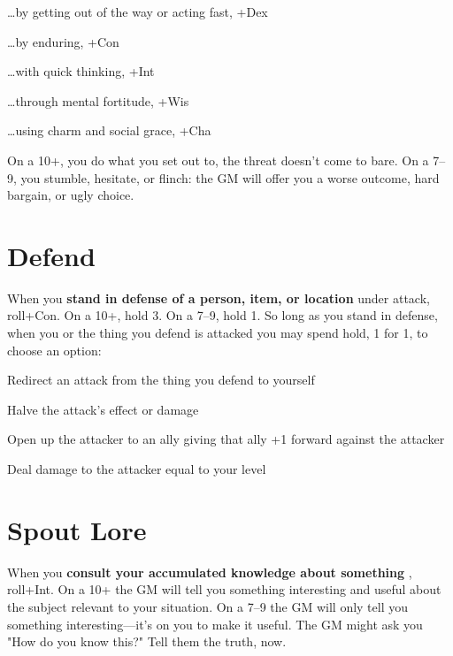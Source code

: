          
\item …by getting out of the way or acting fast, +Dex

         
\item …by enduring, +Con

         
\item …with quick thinking, +Int

         
\item …through mental fortitude, +Wis

         
\item …using charm and social grace, +Cha

       
\stopitemize
       

On a 10+, you do what you set out to, the threat doesn't come to bare. On a 7–9, you stumble, hesitate, or flinch: the GM will offer you a worse outcome, hard bargain, or ugly choice.

       
\section{Defend}   
       

When you {\bf stand in defense of a person, item, or location}  under attack, roll+Con. On a 10+, hold 3. On a 7–9, hold 1. So long as you stand in defense, when you or the thing you defend is attacked you may spend hold, 1 for 1, to choose an option:

       
\startitemize[1,packed]
         
\item Redirect an attack from the thing you defend to yourself

         
\item Halve the attack's effect or damage

         
\item Open up the attacker to an ally giving that ally +1 forward against the attacker

         
\item Deal damage to the attacker equal to your level

       
\stopitemize
       
\section{Spout Lore}    
       

When you {\bf consult your accumulated knowledge about something} , roll+Int. On a 10+ the GM will tell you something interesting and useful about the subject relevant to your situation. On a 7–9 the GM will only tell you something interesting—it's on you to make it useful. The GM might ask you "How do you know this?" Tell them the truth, now.

